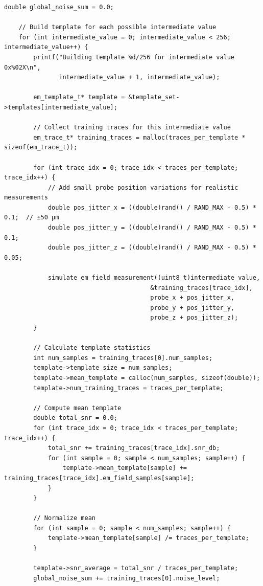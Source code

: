 \documentclass[11pt,a4paper]{article}
\theoremstyle{definition}
\begin{document}
\begin{lstlisting}[caption={Complete EM Template Building Implementation}]
    double global_noise_sum = 0.0;
    
    // Build template for each possible intermediate value
    for (int intermediate_value = 0; intermediate_value < 256; intermediate_value++) {
        printf("Building template %d/256 for intermediate value 0x%02X\n",
               intermediate_value + 1, intermediate_value);
        
        em_template_t* template = &template_set->templates[intermediate_value];
        
        // Collect training traces for this intermediate value
        em_trace_t* training_traces = malloc(traces_per_template * sizeof(em_trace_t));
        
        for (int trace_idx = 0; trace_idx < traces_per_template; trace_idx++) {
            // Add small probe position variations for realistic measurements
            double pos_jitter_x = ((double)rand() / RAND_MAX - 0.5) * 0.1;  // ±50 μm
            double pos_jitter_y = ((double)rand() / RAND_MAX - 0.5) * 0.1;
            double pos_jitter_z = ((double)rand() / RAND_MAX - 0.5) * 0.05;
            
            simulate_em_field_measurement((uint8_t)intermediate_value, 
                                        &training_traces[trace_idx],
                                        probe_x + pos_jitter_x,
                                        probe_y + pos_jitter_y,
                                        probe_z + pos_jitter_z);
        }
        
        // Calculate template statistics
        int num_samples = training_traces[0].num_samples;
        template->template_size = num_samples;
        template->mean_template = calloc(num_samples, sizeof(double));
        template->num_training_traces = traces_per_template;
        
        // Compute mean template
        double total_snr = 0.0;
        for (int trace_idx = 0; trace_idx < traces_per_template; trace_idx++) {
            total_snr += training_traces[trace_idx].snr_db;
            for (int sample = 0; sample < num_samples; sample++) {
                template->mean_template[sample] += training_traces[trace_idx].em_field_samples[sample];
            }
        }
        
        // Normalize mean
        for (int sample = 0; sample < num_samples; sample++) {
            template->mean_template[sample] /= traces_per_template;
        }
        
        template->snr_average = total_snr / traces_per_template;
        global_noise_sum += training_traces[0].noise_level;
        

\end{lstlisting}
\end{document}

